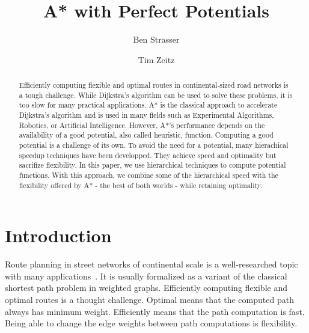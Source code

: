 \documentclass[a4paper,UKenglish,cleveref, autoref]{lipics-v2019}
\title{A* with Perfect Potentials} %
\author{Ben Strasser}{Germany}{academia@ben-strasser.net}{TODO}{}%
\author{Tim Zeitz}{Institute of Theoretical Informatics, Algorithmics I, Karlsruhe Institute of Technology, Germany}{tim.zeitz@kit.edu}{}{}
\begin{document}
\maketitle

\begin{abstract}
Efficiently computing flexible and optimal routes in continental-sized road networks is a tough challenge.
While Dijkstra's algorithm can be used to solve these problems, it is too slow for many practical applications.
A* is the classical approach to accelerate Dijkstra's algorithm and is used in many fields such as Experimental Algorithms, Robotics, or Artificial Intelligence.
However, A*'s performance depends on the availability of a good potential, also called heuristic, function.
Computing a good potential is a challenge of its own.
To avoid the need for a potential, many hierachical speedup techniques have been developped.
They achieve speed and optimality but sacrifize flexibility.
In this paper, we use hierarchical techniques to compute potential functions.
With this approach, we combine some of the hierarchical speed with the flexibility offered by A* - the best of both worlds - while retaining optimality.
\end{abstract}

\section{Introduction}
\label{sec:intro}
Route planning in street networks of continental scale is a well-researched topic with many applications~\cite{bdgmpsww-rptn-16}.
It is usually formalized as a variant of the classical shortest path problem in weighted graphs.
Efficiently computing flexible and optimal routes is a thought challenge.
Optimal means that the computed path always has minimum weight.
Efficiently means that the path computation is fast.
Being able to change the edge weights between path computations is flexibility.
\end{document}
